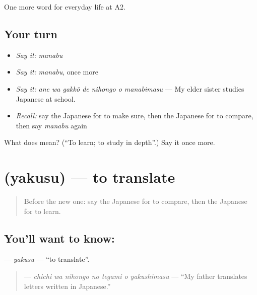 \begin{grammarlens}[title={What you've built}]
One more word for everyday life at A2.
\end{grammarlens}

\subsection*{Your turn}
\begin{itemize}
\raggedright
  \item \emph{Say it:} \emph{manabu}
  \item \emph{Say it:} \emph{manabu}, once more
  \item \emph{Say it:} \emph{ane wa gakkō de nihongo o manabimasu} — My elder sister studies Japanese at school.
  \item \emph{Recall:} say the Japanese for to make sure, then the Japanese for to compare, then say \emph{manabu} again
\end{itemize}

\begin{tcolorbox}[breakable,colback=teal!4,colframe=teal!35!black,title={Before you move on}]
What does  mean? (\textquotedblleft{}To learn; to study in depth\textquotedblright{}.) Say it once more.
\end{tcolorbox}
\section[\texorpdfstring{\ja{やくす} (yakusu)}{やくす (yakusu)}]{ (yakusu) — to translate}

\label{lesson:JA-C228-yakusu}



\begin{quote}
Before the new one: say the Japanese for to compare, then the Japanese for to learn.
\end{quote}

\subsection*{You'll want to know: }
\textbf{} — \emph{yakusu} — \textquotedblleft{}to translate\textquotedblright{}.

\begin{quote}
\textbf{   } — \emph{chichi wa nihongo no tegami o yakushimasu} — \textquotedblleft{}My father translates letters written in Japanese.\textquotedblright{}
\end{quote}

